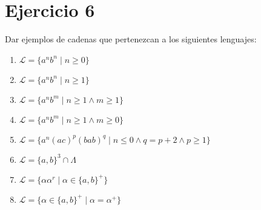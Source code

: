 \documentclass[12pt]{article}
\begin{document}
\section{Ejercicio 6}
Dar ejemplos de cadenas que pertenezcan a los siguientes lenguajes:
\begin{enumerate}[label=\Roman*.]
    \item $\mathcal{L} = \{a^nb^n \mid n\geq 0\}$
    \item $\mathcal{L} = \{a^nb^n \mid n\geq 1\}$
    \item $\mathcal{L} = \{a^nb^m \mid n\geq 1 \land m\geq 1\}$
    \item $\mathcal{L} = \{a^nb^m \mid n\geq 1 \land m\geq 0\}$
    \item $\mathcal{L} = \{a^n(ac)^p(bab)^q \mid n \leq 0 \land q = p +2 \land p \geq 1\}$
    \item $\mathcal{L} =  \{a,b\}^3 \cap \Lambda$
    \item $\mathcal{L} = \{ \alpha\alpha^r \mid \alpha \in \{a,b\}^+\}$
    \item $\mathcal{L} = \{ \alpha \in \{a,b\}^+ \mid \alpha = \alpha^+\}$
    \\
\end{enumerate}
\end{document}
